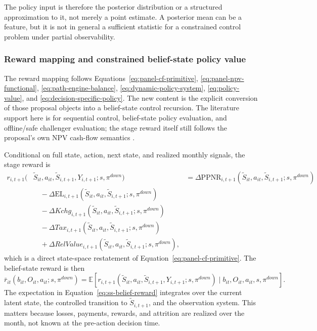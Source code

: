 \documentclass[11pt]{article}
\newcommand{\E}{\mathbb{E}}
\newcommand{\EL}{\mathrm{EL}}
\newcommand{\PPNR}{\mathrm{PPNR}}
\newcommand{\1}{\mathbf{1}}
\begin{document}
The policy input is therefore the posterior distribution or a structured
approximation to it, not merely a point estimate. A posterior mean can be a
feature, but it is not in general a sufficient statistic for a constrained
control problem under partial observability.

\subsubsection{Reward mapping and constrained belief-state policy value}
\label{subsec:state-space-reward-bellman}

The reward mapping follows Equations~\eqref{eq:panel-cf-primitive},
\eqref{eq:panel-npv-functional}, \eqref{eq:path-engine-balance},
\eqref{eq:dynamic-policy-system}, \eqref{eq:policy-value}, and
\eqref{eq:decision-specific-policy}. The new content is the explicit conversion
of those proposal objects into a belief-state control recursion. The literature
support here is for sequential control, belief-state policy evaluation, and
offline/safe challenger evaluation; the stage reward itself still follows the
proposal's own NPV cash-flow semantics
\citep{puterman1994mdp,murphy2003dynamic,smallwood1973pomdp,
kaelbling1998pomdp,jiangli2016dr,huwager2021pomdpope,laroche2019spibb,
khraishiokhrati2022offlinecredit}.

Conditional on full state, action, next state, and realized monthly signals, the
stage reward is
\begin{align}
  r_{i,t+1}(&\widetilde S_{it},a_{it},\widetilde S_{i,t+1},Y_{i,t+1};
      s,\pi^{down})
  &=
  \Delta \PPNR_{i,t+1}(\widetilde S_{it},a_{it},\widetilde S_{i,t+1};
      s,\pi^{down})
  \nonumber\\
  &\quad
  - \Delta \EL_{i,t+1}(\widetilde S_{it},a_{it},\widetilde S_{i,t+1};
      s,\pi^{down})
  \nonumber\\
  &\quad
  - \Delta Kchg_{i,t+1}(\widetilde S_{it},a_{it},\widetilde S_{i,t+1};
      s,\pi^{down})
  \nonumber\\
  &\quad
  - \Delta Tax_{i,t+1}(\widetilde S_{it},a_{it},\widetilde S_{i,t+1};
      s,\pi^{down})
  \nonumber\\
  &\quad
  + \Delta RelValue_{i,t+1}(\widetilde S_{it},a_{it},\widetilde S_{i,t+1};
      s,\pi^{down}),
  \label{eq:ss-stage-reward}
\end{align}
which is a direct state-space restatement of Equation~\eqref{eq:panel-cf-primitive}.
The belief-state reward is then
\begin{equation}
  \bar r_{it}(b_{it},O_{it},a_{it};s,\pi^{down})
  =
  \E[
    r_{i,t+1}(\widetilde S_{it},a_{it},\widetilde S_{i,t+1},Y_{i,t+1};s,\pi^{down})
    \mid b_{it},O_{it},a_{it},s,\pi^{down}
  ].
  \label{eq:ss-belief-reward}
\end{equation}
The expectation in Equation~\eqref{eq:ss-belief-reward} integrates over the
current latent state, the controlled transition to $\widetilde S_{i,t+1}$, and
the observation system. This matters because losses, payments, rewards, and
attrition are realized over the month, not known at the pre-action decision time.
\end{document}
